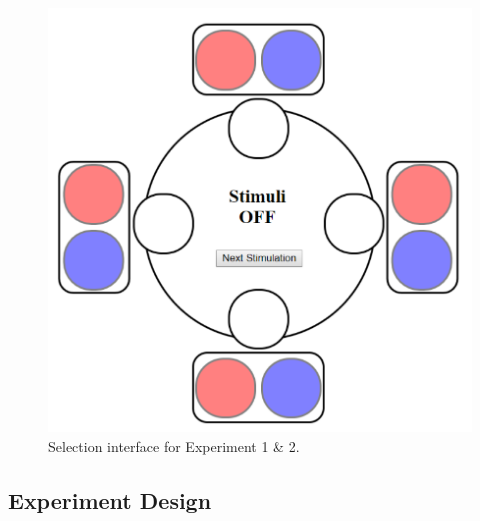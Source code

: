 \documentclass[preprint,12pt]{elsarticle}
\begin{document}

\begin{figure}[h]
  \centering
  \includegraphics[width=0.5\columnwidth]{img/fig10.pdf}
  \caption{Selection interface for Experiment 1 \& 2.}
  \label{fig:10}
\end{figure}

\subsection{Experiment Design}
\end{document}
